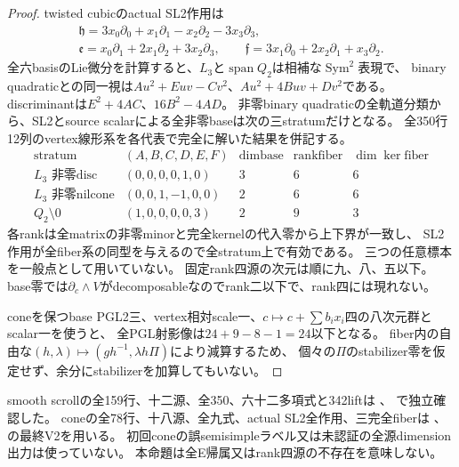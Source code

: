 \documentclass[a4paper,11pt]{ltjsarticle}
\theoremstyle{definition}
\begin{document}
\begin{proof}
twisted cubicのactual SL2作用は
\[
\begin{gathered}
 \mathfrak h=3x_0\partial_0+x_1\partial_1-x_2\partial_2-3x_3\partial_3,\\
 \mathfrak e=x_0\partial_1+2x_1\partial_2+3x_2\partial_3,\qquad
 \mathfrak f=3x_1\partial_0+2x_2\partial_1+x_3\partial_2.
\end{gathered}
\]
全六basisのLie微分を計算すると、$L_3$と$\operatorname{span}Q_2$は相補な$\operatorname{Sym}^2$表現で、
binary quadraticとの同一視は$Au^2+Euv-Cv^2$、$Au^2+4Buv+Dv^2$である。
discriminantは$E^2+4AC$、$16B^2-4AD$。
非零binary quadraticの全軌道分類から、SL2とsource scalarによる全非零baseは次の三stratumだけとなる。
全350行12列のvertex線形系を各代表で完全に解いた結果を併記する。
\[
\begin{array}{c|c|r|r|r}
 \text{stratum}&(A,B,C,D,E,F)&\dim\text{base}&\operatorname{rank}\text{fiber}&\dim\ker\text{fiber}\\\hline
 L_3\text{ 非零disc}&(0,0,0,0,1,0)&3&6&6\\
 L_3\text{ 非零nilcone}&(0,0,1,-1,0,0)&2&6&6\\
 Q_2\setminus0&(1,0,0,0,0,3)&2&9&3
\end{array}
\]
各rankは全matrixの非零minorと完全kernelの代入零から上下界が一致し、
SL2作用が全fiber系の同型を与えるので全stratum上で有効である。
三つの任意標本を一般点として用いていない。
固定rank四源の次元は順に九、八、五以下。
base零では$\partial_c\wedge V$がdecomposableなのでrank二以下で、rank四には現れない。

coneを保つbase PGL2三、vertex相対scale一、$c\mapsto c+\sum b_ix_i$四の八次元群とscalar一を使うと、
全PGL射影像は$24+9-8-1=24$以下となる。
fiber内の自由な$(h,\lambda)\mapsto(gh^{-1},\lambda h\Pi)$により減算するため、
個々の$\Pi$のstabilizer零を仮定せず、余分にstabilizerを加算してもいない。
\end{proof}
smooth scrollの全159行、十二源、全350、六十二多項式と342liftは
、
で独立確認した。
coneの全78行、十八源、全九式、actual SL2全作用、三完全fiberは
、
の最終V2を用いる。
初回coneの誤semisimpleラベル又は未認証の全源dimension出力は使っていない。
本命題は全E帰属又はrank四源の不存在を意味しない。
\end{document}
